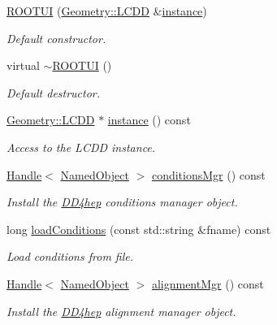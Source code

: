 \begin{DoxyCompactItemize}
\item 
\hyperlink{class_d_d4hep_1_1_r_o_o_t_u_i_ab1850fd130f80807ff936d85f307e3e0}{R\+O\+O\+T\+UI} (\hyperlink{class_d_d4hep_1_1_geometry_1_1_l_c_d_d}{Geometry\+::\+L\+C\+DD} \&\hyperlink{class_d_d4hep_1_1_r_o_o_t_u_i_ac60583ecd1fc6819cec76aaacfc3f3c7}{instance})
\begin{DoxyCompactList}\small\item\em Default constructor. \end{DoxyCompactList}\item 
virtual \hyperlink{class_d_d4hep_1_1_r_o_o_t_u_i_a029c3848c27bda2a4d12e706918c109f}{$\sim$\+R\+O\+O\+T\+UI} ()
\begin{DoxyCompactList}\small\item\em Default destructor. \end{DoxyCompactList}\item 
\hyperlink{class_d_d4hep_1_1_geometry_1_1_l_c_d_d}{Geometry\+::\+L\+C\+DD} $\ast$ \hyperlink{class_d_d4hep_1_1_r_o_o_t_u_i_ac60583ecd1fc6819cec76aaacfc3f3c7}{instance} () const
\begin{DoxyCompactList}\small\item\em Access to the L\+C\+DD instance. \end{DoxyCompactList}\item 
\hyperlink{class_d_d4hep_1_1_handle}{Handle}$<$ \hyperlink{class_d_d4hep_1_1_named_object}{Named\+Object} $>$ \hyperlink{class_d_d4hep_1_1_r_o_o_t_u_i_ae0abcc8009f3466d0d42a442a25016e2}{conditions\+Mgr} () const
\begin{DoxyCompactList}\small\item\em Install the \hyperlink{namespace_d_d4hep}{D\+D4hep} conditions manager object. \end{DoxyCompactList}\item 
long \hyperlink{class_d_d4hep_1_1_r_o_o_t_u_i_a71c5b20a2ce2493401bf543de9e983eb}{load\+Conditions} (const std\+::string \&fname) const
\begin{DoxyCompactList}\small\item\em Load conditions from file. \end{DoxyCompactList}\item 
\hyperlink{class_d_d4hep_1_1_handle}{Handle}$<$ \hyperlink{class_d_d4hep_1_1_named_object}{Named\+Object} $>$ \hyperlink{class_d_d4hep_1_1_r_o_o_t_u_i_a8a7515c23e2c8129948fb61019dabf36}{alignment\+Mgr} () const
\begin{DoxyCompactList}\small\item\em Install the \hyperlink{namespace_d_d4hep}{D\+D4hep} alignment manager object. \end{DoxyCompactList}\item 

\end{DoxyCompactItemize}
